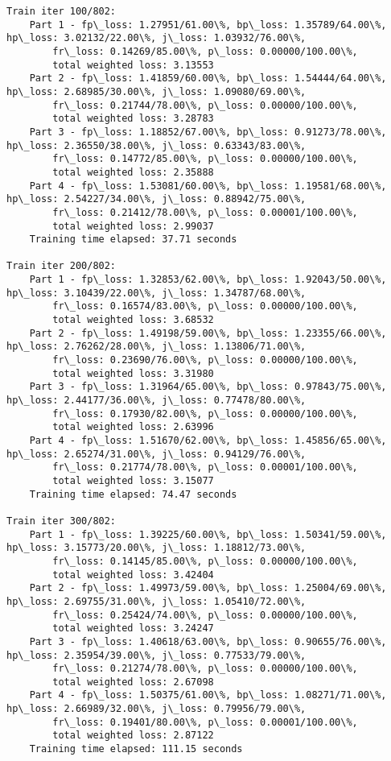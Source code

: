 \documentclass[11pt]{article}
\begin{document}
\begin{Verbatim}[commandchars=\\\{\}]
Train iter 100/802:
	Part 1 - fp\_loss: 1.27951/61.00\%, bp\_loss: 1.35789/64.00\%, hp\_loss: 3.02132/22.00\%, j\_loss: 1.03932/76.00\%, 
		fr\_loss: 0.14269/85.00\%, p\_loss: 0.00000/100.00\%, 
		total weighted loss: 3.13553
	Part 2 - fp\_loss: 1.41859/60.00\%, bp\_loss: 1.54444/64.00\%, hp\_loss: 2.68985/30.00\%, j\_loss: 1.09080/69.00\%, 
		fr\_loss: 0.21744/78.00\%, p\_loss: 0.00000/100.00\%, 
		total weighted loss: 3.28783
	Part 3 - fp\_loss: 1.18852/67.00\%, bp\_loss: 0.91273/78.00\%, hp\_loss: 2.36550/38.00\%, j\_loss: 0.63343/83.00\%, 
		fr\_loss: 0.14772/85.00\%, p\_loss: 0.00000/100.00\%, 
		total weighted loss: 2.35888
	Part 4 - fp\_loss: 1.53081/60.00\%, bp\_loss: 1.19581/68.00\%, hp\_loss: 2.54227/34.00\%, j\_loss: 0.88942/75.00\%, 
		fr\_loss: 0.21412/78.00\%, p\_loss: 0.00001/100.00\%, 
		total weighted loss: 2.99037
	Training time elapsed: 37.71 seconds

Train iter 200/802:
	Part 1 - fp\_loss: 1.32853/62.00\%, bp\_loss: 1.92043/50.00\%, hp\_loss: 3.10439/22.00\%, j\_loss: 1.34787/68.00\%, 
		fr\_loss: 0.16574/83.00\%, p\_loss: 0.00000/100.00\%, 
		total weighted loss: 3.68532
	Part 2 - fp\_loss: 1.49198/59.00\%, bp\_loss: 1.23355/66.00\%, hp\_loss: 2.76262/28.00\%, j\_loss: 1.13806/71.00\%, 
		fr\_loss: 0.23690/76.00\%, p\_loss: 0.00000/100.00\%, 
		total weighted loss: 3.31980
	Part 3 - fp\_loss: 1.31964/65.00\%, bp\_loss: 0.97843/75.00\%, hp\_loss: 2.44177/36.00\%, j\_loss: 0.77478/80.00\%, 
		fr\_loss: 0.17930/82.00\%, p\_loss: 0.00000/100.00\%, 
		total weighted loss: 2.63996
	Part 4 - fp\_loss: 1.51670/62.00\%, bp\_loss: 1.45856/65.00\%, hp\_loss: 2.65274/31.00\%, j\_loss: 0.94129/76.00\%, 
		fr\_loss: 0.21774/78.00\%, p\_loss: 0.00001/100.00\%, 
		total weighted loss: 3.15077
	Training time elapsed: 74.47 seconds

Train iter 300/802:
	Part 1 - fp\_loss: 1.39225/60.00\%, bp\_loss: 1.50341/59.00\%, hp\_loss: 3.15773/20.00\%, j\_loss: 1.18812/73.00\%, 
		fr\_loss: 0.14145/85.00\%, p\_loss: 0.00000/100.00\%, 
		total weighted loss: 3.42404
	Part 2 - fp\_loss: 1.49973/59.00\%, bp\_loss: 1.25004/69.00\%, hp\_loss: 2.69755/31.00\%, j\_loss: 1.05410/72.00\%, 
		fr\_loss: 0.25424/74.00\%, p\_loss: 0.00000/100.00\%, 
		total weighted loss: 3.24247
	Part 3 - fp\_loss: 1.40618/63.00\%, bp\_loss: 0.90655/76.00\%, hp\_loss: 2.35954/39.00\%, j\_loss: 0.77533/79.00\%, 
		fr\_loss: 0.21274/78.00\%, p\_loss: 0.00000/100.00\%, 
		total weighted loss: 2.67098
	Part 4 - fp\_loss: 1.50375/61.00\%, bp\_loss: 1.08271/71.00\%, hp\_loss: 2.66989/32.00\%, j\_loss: 0.79956/79.00\%, 
		fr\_loss: 0.19401/80.00\%, p\_loss: 0.00001/100.00\%, 
		total weighted loss: 2.87122
	Training time elapsed: 111.15 seconds


\end{Verbatim}
\end{document}
